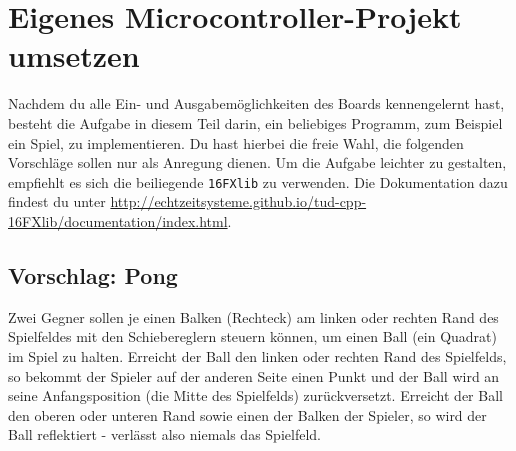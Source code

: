 \section{\ExercisePrefixEmbeddedC Eigenes Microcontroller-Projekt umsetzen \optional}

\optionaltextbox

Nachdem du alle Ein- und Ausgabemöglichkeiten des Boards kennengelernt hast, besteht die Aufgabe in diesem Teil darin, ein beliebiges Programm, zum Beispiel ein Spiel, zu implementieren.
Du hast hierbei die freie Wahl, die folgenden Vorschläge sollen nur als Anregung dienen.
Um die Aufgabe leichter zu gestalten, empfiehlt es sich die beiliegende \lstinline{16FXlib} zu verwenden.
Die Dokumentation dazu findest du unter \url{http://echtzeitsysteme.github.io/tud-cpp-16FXlib/documentation/index.html}.

\subsection*{Vorschlag: Pong}
Zwei Gegner sollen je einen Balken (Rechteck) am linken oder rechten Rand des Spielfeldes mit den Schiebereglern steuern können, um einen Ball (ein Quadrat) im Spiel zu halten.
Erreicht der Ball den linken oder rechten Rand des Spielfelds, so bekommt der Spieler auf der anderen Seite einen Punkt und der Ball wird an seine Anfangsposition (die Mitte des Spielfelds) zurückversetzt.
Erreicht der Ball den oberen oder unteren Rand sowie einen der Balken der Spieler, so wird der Ball reflektiert - verlässt also niemals das Spielfeld.

